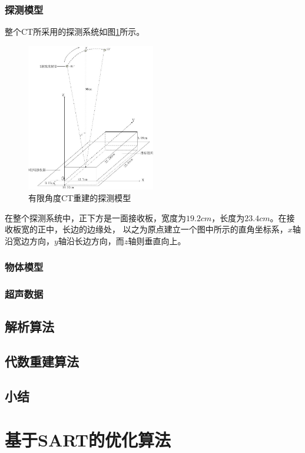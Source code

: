 \subsection{探测模型}
整个CT所采用的探测系统如图\ref{fig:model1}所示。
\begin{figure}[h]
\center
\includegraphics[width=0.5\textwidth]{figure/model1}
\caption{有限角度CT重建的探测模型}\label{fig:model1}
\end{figure}
在整个探测系统中，正下方是一面接收板，宽度为$19.2cm$，长度为$23.4cm$。在接收板宽的正中，长边的边缘处，
以之为原点建立一个图中所示的直角坐标系，$x$轴沿宽边方向，$y$轴沿长边方向，而$z$轴则垂直向上。
\subsection{物体模型}
\subsection{超声数据}

\section{解析算法}
\section{代数重建算法}
\section{小结}



\chapter{基于SART的优化算法}
